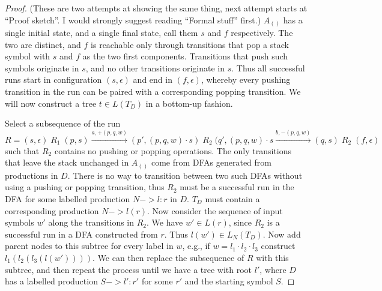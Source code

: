 \documentclass[acmsmall,review,anonymous]{acmart}\settopmatter{printfolios=true,printccs=false,printacmref=false}
\newcommand{\pospl}{(}
\newcommand{\pospr}{)}
\newcommand{\posp}[1]{\pospl#1\pospr}
\begin{document}
\begin{proof}
  (These are two attempts at showing the same thing, next attempt starts at ``Proof sketch''. I would strongly suggest reading ``Formal stuff'' first.)
  $A_{\posp{}}$ has a single initial state, and a single final state, call them $s$ and $f$ respectively. The two are distinct, and $f$ is reachable only through transitions that pop a stack symbol with $s$ and $f$ as the two first components. Transitions that push such symbols originate in $s$, and no other transitions originate in $s$. Thus all successful runs start in configuration $(s, \epsilon)$ and end in $(f, \epsilon)$, whereby every pushing transition in the run can be paired with a corresponding popping transition. We will now construct a tree $t \in L(T_D)$ in a bottom-up fashion.

  Select a subsequence of the run $R = (s, \epsilon) \; R_1 \; (p, s) \xrightarrow{a, +(p, q, w)} (p', (p, q, w) \cdot s) \; R_2 \; (q', (p, q, w) \cdot s \xrightarrow{b, -(p, q, w)} (q, s) \; R_2 \; (f, \epsilon)$ such that $R_2$ contains no pushing or popping operations. The only transitions that leave the stack unchanged in $A_{\posp{}}$ come from DFAs generated from productions in $D$. There is no way to transition between two such DFAs without using a pushing or popping transition, thus $R_2$ must be a successful run in the DFA for some labelled production $N -> l : r$ in $D$. $T_D$ must contain a corresponding production $N -> l(r)$. Now consider the sequence of input symbols $w'$ along the transitions in $R_2$. We have $w' \in L(r)$, since $R_2$ is a successful run in a DFA constructed from $r$. Thus $l(w') \in L_N(T_D)$. Now add parent nodes to this subtree for every label in $w$, e.g., if $w = l_1 \cdot l_2 \cdot l_3$ construct $l_1(l_2(l_3(l(w'))))$. We can then replace the subsequence of $R$ with this subtree, and then repeat the process until we have a tree with root $l'$, where $D$ has a labelled production $S -> l': r'$ for some $r'$ and the starting symbol $S$.


\end{proof}
\end{document}
